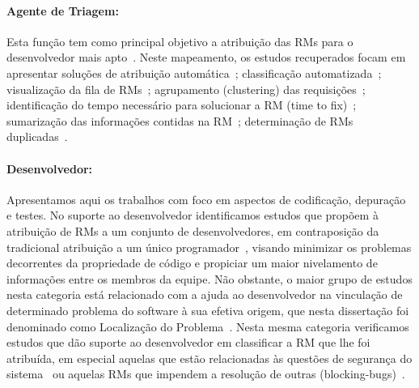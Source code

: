 \paragraph{Agente de Triagem:} Esta função tem como principal objetivo a
atribuição das RMs para o desenvolvedor mais apto~\cite{banitaan2013decoba}.
Neste mapeamento, os estudos recuperados focam em apresentar soluções de
atribuição automática~\cite{banitaan2013decoba, shokripour2012automatic,
	somasundaram2012automatic, Naguib2013, Zhang2014, Zanetti2013};
classificação automatizada~\cite{gegick2010identifying,liu2014faceted,
	behl2014bug, chawla2015automated,tian2015automated}; visualização da fila de
RMs~\cite{izquierdo2015gila}; agrupamento (clustering) das
requisições~\cite{liu2014faceted}; identificação do tempo necessário para
solucionar a RM (time to fix)~\cite{hosseini2012market,
	Bhattacharya:2011:BTP:1985441.1985472}; sumarização das informações contidas
na RM~\cite{mani2012ausum}; determinação de RMs duplicadas~\cite{Sun2011,
	Wu2011a}.

\paragraph{Desenvolvedor:}

Apresentamos aqui os trabalhos com foco em aspectos de co\-di\-fi\-ca\-ção,
depuração e testes. No suporte ao desenvolvedor identificamos estudos que
propõem à atribuição de RMs a um conjunto de desenvolvedores, em contraposição
da tradicional atribuição a um único programador~\cite{banitaan2013decoba},
visando minimizar os pro\-ble\-mas decorrentes da propriedade de código e
propiciar um maior nivelamento de informações entre os membros da equipe. Não
obstante, o maior grupo de estudos nesta categoria está relacionado com a ajuda
ao desenvolvedor na vinculação de determinado problema do software à sua efetiva
origem, que nesta dissertação foi denominado como Localização do
Problema~\cite{corley2011recovering,Wong:2014:BBF:2705615.2706096,
	Thung:2014:BIT:2635868.2661678,Nguyen:2012:MAR:2393596.2393671,thung2013automatic,
	Romo:2015:TAT:2745802.2745833}. Nesta mesma categoria verificamos estudos
que dão suporte ao desenvolvedor em classificar a RM que lhe foi atribuída, em
especial aquelas que estão relacionadas às questões de segurança do
sistema~\cite{gegick2010identifying} ou aquelas RMs que impendem a resolução de
outras (blocking-bugs)~\cite{ValdiviaGarcia:2014:CPB:2597073.2597099}.

